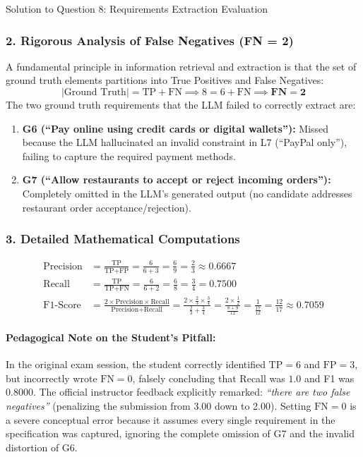 \documentclass[11pt,a4paper]{article}
\begin{document}
\begin{solutionbox}{Solution to Question 8: Requirements Extraction Evaluation}
\subsubsection*{2. Rigorous Analysis of False Negatives (FN = 2)}
A fundamental principle in information retrieval and extraction is that the set of ground truth elements partitions into True Positives and False Negatives:
\begin{equation*}
|\text{Ground Truth}| = \text{TP} + \text{FN} \implies 8 = 6 + \text{FN} \implies \mathbf{\text{FN} = 2}
\end{equation*}
The two ground truth requirements that the LLM failed to correctly extract are:
\begin{enumerate}[noitemsep]
    \item \textbf{G6 (``Pay online using credit cards or digital wallets''):} Missed because the LLM hallucinated an invalid constraint in L7 (``PayPal only''), failing to capture the required payment methods.
    \item \textbf{G7 (``Allow restaurants to accept or reject incoming orders''):} Completely omitted in the LLM's generated output (no candidate addresses restaurant order acceptance/rejection).
\end{enumerate}

\subsubsection*{3. Detailed Mathematical Computations}
\begin{align*}
\text{Precision} &= \frac{\text{TP}}{\text{TP} + \text{FP}} = \frac{6}{6 + 3} = \frac{6}{9} = \frac{2}{3} \approx \mathbf{0.6667} \\[6pt]
\text{Recall} &= \frac{\text{TP}}{\text{TP} + \text{FN}} = \frac{6}{6 + 2} = \frac{6}{8} = \frac{3}{4} = \mathbf{0.7500} \\[6pt]
\text{F1-Score} &= \frac{2 \times \text{Precision} \times \text{Recall}}{\text{Precision} + \text{Recall}} = \frac{2 \times \frac{2}{3} \times \frac{3}{4}}{\frac{2}{3} + \frac{3}{4}} = \frac{2 \times \frac{1}{2}}{\frac{8 + 9}{12}} = \frac{1}{\frac{17}{12}} = \frac{12}{17} \approx \mathbf{0.7059}
\end{align*}

\paragraph{Pedagogical Note on the Student's Pitfall:}
In the original exam session, the student correctly identified $\text{TP} = 6$ and $\text{FP} = 3$, but incorrectly wrote $\text{FN} = 0$, falsely concluding that Recall was $1.0$ and F1 was $0.8000$. The official instructor feedback explicitly remarked: \textit{``there are two false negatives''} (penalizing the submission from 3.00 down to 2.00). Setting $\text{FN} = 0$ is a severe conceptual error because it assumes every single requirement in the specification was captured, ignoring the complete omission of G7 and the invalid distortion of G6.
\end{solutionbox}
\end{document}
